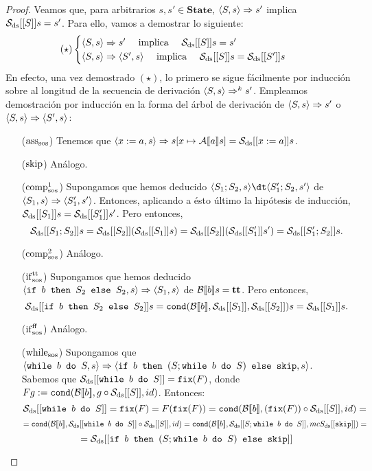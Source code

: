 \begin{proof}
Veamos que, para arbitrarios $s, s' \in \mathbf{State}$, $\langle S, s \rangle\Rightarrow s'$ implica $\mathcal{S}_{\mathrm{ds}}[[S]]s = s'$. Para ello, vamos a demostrar lo siguiente:
$$(\star) \begin{cases}
    \langle S, s \rangle\Rightarrow s' \quad \text{ implica }\quad \mathcal{S}_{\mathrm{ds}}[[S]]s=s' \\
    \langle S, s \rangle\Rightarrow \langle S', s \rangle \quad \text{ implica }\quad \mathcal{S}_{\mathrm{ds}}[[S]]s= \mathcal{S}_{\mathrm{ds}}[[S']]s 
\end{cases}$$
En efecto, una vez demostrado $(\star)$, lo primero se sigue fácilmente por inducción sobre al longitud de la secuencia de derivación $\langle S, s \rangle\Rightarrow^k s'$. Empleamos demostración por inducción en la forma del árbol de derivación de $ \langle S, s \rangle\Rightarrow s'$ o $\langle S, s \rangle\Rightarrow \langle S', s \rangle$:
\begin{itemize}
    \item[($\mathrm{ass}_{\mathrm{sos}}$)] Tenemos que $\langle x:= a, s \rangle\Rightarrow s[x\mapsto \mathcal{A}[\![a]\!]s] = \mathcal{S}_{\mathrm{ds}}[[x:=a]]s$.
    \item[($\mathrm{skip}$)] Análogo.
    \item[($\mathrm{comp}^1_{\mathrm{sos}}$)] Supongamos que hemos deducido $\la{S_1;S_2}{s} \dt \la{S_1';S_2}{s'}$ de $\langle S_1, s \rangle\Rightarrow \langle S'_1, s' \rangle$. Entonces, aplicando a ésto último la hipótesis de inducción, $\mathcal{S}_{\mathrm{ds}}[[S_1]]s = \mathcal{S}_{\mathrm{ds}}[[S'_1]]s'$. Pero entonces, 
    $$\mathcal{S}_{\mathrm{ds}}[[S_1;S_2]]s = \mathcal{S}_{\mathrm{ds}}[[S_2]](\mathcal{S}_{\mathrm{ds}}[[S_1]]s) = \mathcal{S}_{\mathrm{ds}}[[S_2]](\mathcal{S}_{\mathrm{ds}}[[S'_1]]s') = \mathcal{S}_{\mathrm{ds}}[[S'_1;S_2]]s.$$
    \item[($\mathrm{comp}^2_{\mathrm{sos}}$)] Análogo.
     \item[($\mathrm{if}^{\mathrm{tt}}_{\mathrm{sos}}$)] Supongamos que hemos deducido $\langle \texttt{if }b \texttt{ then }S_2\texttt{ else }S_2, s \rangle \Rightarrow \langle S_1, s \rangle$ de $\mathcal{B}[\![b]\!]s = \mathbf{tt}$. Pero entonces, 
     $$\mathcal{S}_{\mathrm{ds}}[[\texttt{if }b \texttt{ then }S_2\texttt{ else }S_2]]s = \texttt{cond}(\mathcal{B}[\![b]\!], \mathcal{S}_{\mathrm{ds}}[[S_1]], \mathcal{S}_{\mathrm{ds}}[[S_2]])s = \mathcal{S}_{\mathrm{ds}}[[S_1]]s.$$
     \item[($\mathrm{if}^{\mathrm{ff}}_{\mathrm{sos}}$)] Análogo.
     \item[($\mathrm{while}_{\mathrm{sos}}$)] Supongamos que $\langle \texttt{while }b\texttt{ do }S, s \rangle\Rightarrow \langle \texttt{if }b\texttt{ then }(S; \texttt{while }b\texttt{ do }S)\texttt{ else skip}, s \rangle$. Sabemos que $\mathcal{S}_{\mathrm{ds}}[[\texttt{while }b\texttt{ do }S]] = \texttt{fix}(F)$, donde $Fg := \texttt{cond}(\mathcal{B}[\![b]\!], g\circ \mathcal{S}_{\mathrm{ds}}[[S]], id)$. Entonces:
     $$\mathcal{S}_{\mathrm{ds}}[[\texttt{while }b\texttt{ do }S]] = \texttt{fix}(F) = F(\texttt{fix}(F)) =  \texttt{cond}(\mathcal{B}[\![b]\!], (\texttt{fix}(F))\circ \mathcal{S}_{\mathrm{ds}}[[S]] , id) = $$
     $$ = \texttt{cond}(\mathcal{B}[\![b]\!], \mathcal{S}_{\mathrm{ds}}[[\texttt{while }b\texttt{ do }S]]\circ\mathcal{S}_{\mathrm{ds}}[[S]] , id) = \texttt{cond}(\mathcal{B}[\![b]\!], \mathcal{S}_{\mathrm{ds}}[[S;\texttt{while }b\texttt{ do }S]], mc{S}_{\mathrm{ds}}[[\texttt{skip}]]) = $$ $$=\mathcal{S}_{\mathrm{ds}}[[\texttt{if }b\texttt{ then }(S; \texttt{while }b\texttt{ do }S)\texttt{ else skip}]]$$
\end{itemize}
\end{proof}

